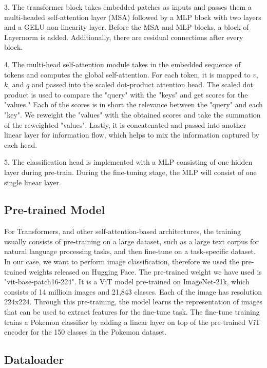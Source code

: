 \documentclass{article} %
\begin{document}
3. The transformer block takes embedded patches as inputs and passes them a multi-headed self-attention layer (MSA)
followed by a MLP block with two layers and a GELU non-linearity layer. Before the MSA and MLP blocks, a block of Layernorm is added.
Additionally, there are residual connections after every block.

4. The multi-head self-attention module takes in the embedded sequence of tokens and computes the global self-attention.
For each token, it is mapped to $v$, $k$, and $q$ and passed into the scaled dot-product attention head.
The scaled dot product is used to compare the "query" with the "keys" and get scores for the "values."
Each of the scores is in short the relevance between the "query" and each "key".
We reweight the "values" with the obtained scores and take the summation of the reweighted "values".
Lastly, it is concatenated and passed into another linear layer for information flow, which helps to mix the information captured by each head.

5. The classification head is implemented with a MLP consisting of one hidden layer during pre-train.
During the fine-tuning stage, the MLP will consist of one single linear layer.



\subsection{Pre-trained Model}
For Transformers, and other self-attention-based architectures, the training usually consists of pre-training on 
a large dataset, such as a large text corpus for natural language processing tasks, and then fine-tune on a 
task-specific dataset. In our case, we want to perform image classification, therefore we used the pre-trained weights
released on Hugging Face. The pre-trained weight we have used is "vit-base-patch16-224". It is a ViT model pre-trained
on ImageNet-21k, which consists of 14 millioin images and 21,843 classes. Each of the image has resolution 224x224.
Through this pre-training, the model learns the representation of images that can be used to extract features for the
fine-tune task. The fine-tune training trains a Pokemon classifier by adding a linear layer on top of the pre-trained
ViT encoder for the 150 classes in the Pokemon dataset.

\subsection{Dataloader} %
\end{document}
